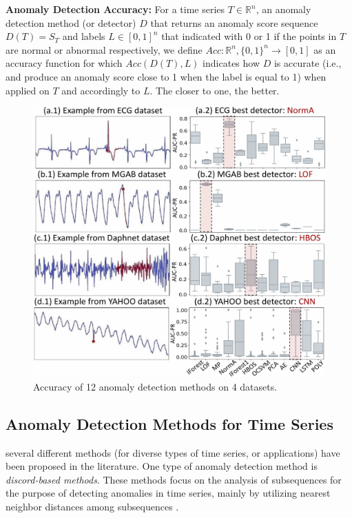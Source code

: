 \textbf{Anomaly Detection Accuracy: }For a time series $T \in \mathbb{R}^n $, an anomaly detection method (or detector) $D$ that returns an anomaly score sequence $D(T) = S_T$ and labels $L \in [0,1]^n$ that indicated with 0 or 1 if the points in $T$ are normal or abnormal respectively, we define $Acc:\mathbb{R}^n,\{0,1\}^n \rightarrow [0,1]$ as an accuracy function for which $Acc(D(T),L)$ indicates how $D$ is accurate (i.e., and produce an anomaly score close to 1 when the label is equal to 1) when applied on $T$ and accordingly to $L$. The closer to one, the better.

\begin{figure}
    \centering
    \includegraphics[width=1\linewidth]{figures/Fig2.jpg}
    \caption{Accuracy of 12 anomaly detection methods on 4 datasets.}
    \label{fig:diversity}
\end{figure}

\subsection{Anomaly Detection Methods for Time Series}
\label{sec:ad_methods}

 several different methods (for diverse types of time series, or applications) have been proposed in the literature. One type of anomaly detection method is \textit{discord-based methods}. These methods focus on the analysis of subsequences for the purpose of detecting anomalies in time series, mainly by utilizing nearest neighbor distances among subsequences \cite{DBLP:conf/icdm/YehZUBDDSMK16,DBLP:conf/edbt/Senin0WOGBCF15,Keogh2007,Liu2009,DBLP:conf/adma/FuLKL06,DBLP:conf/sdm/BuLFKPM07,DBLP:journals/datamine/LinardiZPK20}. 


